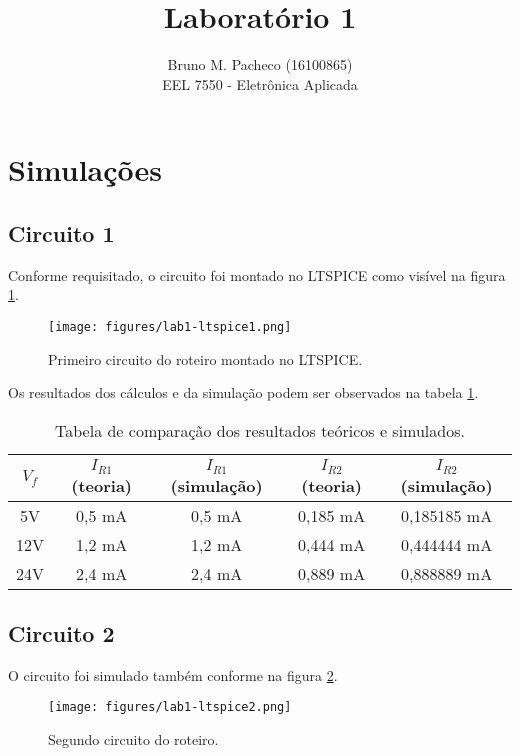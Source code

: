 \documentclass[a4paper]{report}
\begin{document}
 
\title{Laboratório 1}
\author{Bruno M. Pacheco (16100865)\\
EEL 7550 - Eletrônica Aplicada}
 
\maketitle
 
\section*{Simulações}

\subsection*{Circuito 1}

Conforme requisitado, o circuito foi montado no LTSPICE como visível na figura \ref{fig:ltspice-1}.

\begin{figure}[h]
    \centering
    \texttt{[image: figures/lab1-ltspice1.png]}
    \caption{Primeiro circuito do roteiro montado no LTSPICE.}
    \label{fig:ltspice-1}
\end{figure}

Os resultados dos cálculos e da simulação podem ser observados na tabela \ref{tab:circ-1}.

\begin{table}[h]
    \centering
    \caption{Tabela de comparação dos resultados teóricos e simulados.}
    \label{tab:circ-1}
    \begin{tabular}{c | c | c | c | c}
	$V_f$ & $I_{R1}$ (teoria) & $I_{R1}$ (simulação) & $I_{R2}$ (teoria) & $I_{R2}$ (simulação)  \\
	\hline
	5V & 0,5 mA & 0,5 mA & 0,185 mA & 0,185185 mA \\
	12V & 1,2 mA & 1,2 mA & 0,444 mA & 0,444444 mA \\
	24V & 2,4 mA & 2,4 mA & 0,889 mA & 0,888889 mA
    \end{tabular}
\end{table}

\subsection*{Circuito 2}

O circuito foi simulado também conforme na figura \ref{fig:figures-lab1-ltspice2-png}.

\begin{figure}[h]
    \centering
    \texttt{[image: figures/lab1-ltspice2.png]}
    \caption{Segundo circuito do roteiro.}
    \label{fig:figures-lab1-ltspice2-png}
\end{figure}
\end{document}
